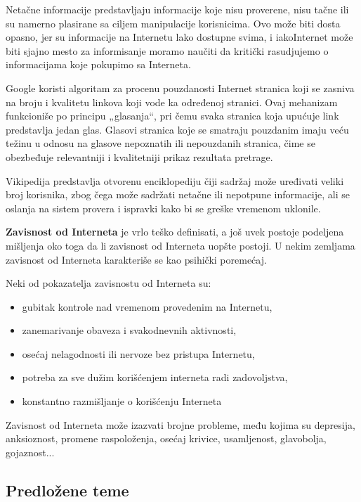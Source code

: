 \documentclass[a4paper, 12pt]{article}
\begin{document}
Netačne informacije predstavljaju informacije koje nisu proverene, nisu tačne ili
su namerno plasirane sa ciljem manipulacije korisnicima. Ovo može biti dosta opasno, jer su informacije na Internetu lako dostupne svima, i iakoInternet može biti sjajno mesto za informisanje moramo naučiti da kritički rasudjujemo o informacijama koje pokupimo sa Interneta.

Google koristi algoritam za procenu pouzdanosti Internet stranica koji se zasniva na broju i kvalitetu linkova koji vode ka određenoj stranici. Ovaj mehanizam funkcioniše po principu „glasanja“, pri čemu svaka stranica koja upućuje link predstavlja jedan glas. Glasovi stranica koje se smatraju pouzdanim imaju veću težinu u odnosu na glasove nepoznatih ili nepouzdanih stranica, čime se obezbeđuje relevantniji i kvalitetniji prikaz rezultata pretrage.

Vikipedija predstavlja otvorenu enciklopediju čiji sadržaj može uređivati veliki
broj korisnika, zbog čega može sadržati netačne ili nepotpune informacije, ali se
oslanja na sistem provera i ispravki kako bi se greške vremenom uklonile.

\vspace{\baselineskip}

\textbf{Zavisnost od Interneta} je vrlo teško definisati, a još uvek postoje podeljena mišljenja oko toga da li zavisnost od Interneta uopšte postoji.
U nekim zemljama zavisnost od Interneta karakteriše se kao psihički poremećaj.

Neki od pokazatelja zavisnostu od Interneta su:
\begin{itemize}
    \item gubitak kontrole nad vremenom provedenim na Internetu,
    \item zanemarivanje obaveza i svakodnevnih aktivnosti,
    \item osećaj nelagodnosti ili nervoze bez pristupa Internetu,
    \item potreba za sve dužim korišćenjem interneta radi zadovoljstva,
    \item konstantno razmišljanje o korišćenju Interneta
\end{itemize}

Zavisnost od Interneta može izazvati brojne probleme, među kojima su depresija, anksioznost, promene raspoloženja, osećaj krivice, usamljenost, glavobolja, gojaznost...

\subsection{Predložene teme}
\end{document}
